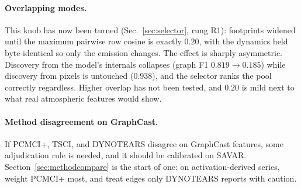 \paragraph{Overlapping modes.} This knob has now been turned
(Sec.~\ref{sec:selector}, rung R1): footprints widened until the maximum pairwise
row cosine is exactly $0.20$, with the dynamics held byte-identical so only the
emission changes. The effect is sharply asymmetric. Discovery from the model's
internals collapses (graph F1 $0.819 \to 0.185$) while discovery from pixels is
untouched ($0.938$), and the selector ranks the pool correctly regardless. Higher
overlap has not been tested, and $0.20$ is mild next to what real atmospheric
features would show.

\paragraph{Method disagreement on GraphCast.} If PCMCI+, TSCI, and DYNOTEARS
disagree on GraphCast features, some adjudication rule is needed, and it should be
calibrated on SAVAR. Section~\ref{sec:methodcompare} is the start of one: on
activation-derived series, weight PCMCI+ most, and treat edges only DYNOTEARS
reports with caution.
